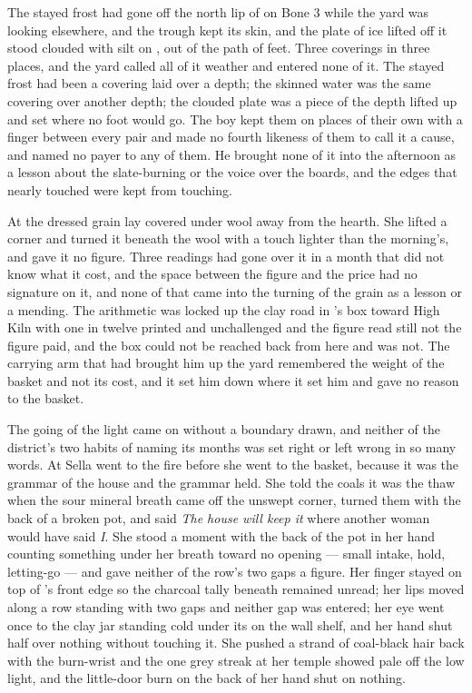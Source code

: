 The stayed frost had gone off the north lip of  on Bone 3 while the yard was looking elsewhere, and the trough kept its skin, and the plate of ice lifted off it stood clouded with silt on , out of the path of feet. Three coverings in three places, and the yard called all of it weather and entered none of it. The stayed frost had been a covering laid over a depth; the skinned water was the same covering over another depth; the clouded plate was a piece of the depth lifted up and set where no foot would go. The boy kept them on places of their own with a finger between every pair and made no fourth likeness of them to call it a cause, and named no payer to any of them. He brought none of it into the afternoon as a lesson about the slate-burning or the voice over the boards, and the edges that nearly touched were kept from touching.

At  the dressed grain lay covered under wool away from the hearth. She lifted a corner and turned it beneath the wool with a touch lighter than the morning's, and gave it no figure. Three readings had gone over it in a month that did not know what it cost, and the space between the figure and the price had no signature on it, and none of that came into the turning of the grain as a lesson or a mending. The arithmetic was locked up the clay road in 's box toward High Kiln with one in twelve printed and unchallenged and the figure read still not the figure paid, and the box could not be reached back from here and was not. The carrying arm that had brought him up the yard remembered the weight of the basket and not its cost, and it set him down where it set him and gave no reason to the basket.

The going of the light came on without a boundary drawn, and neither of the district's two habits of naming its months was set right or left wrong in so many words. At  Sella went to the fire before she went to the basket, because it was the grammar of the house and the grammar held. She told the coals it was the thaw when the sour mineral breath came off the unswept corner, turned them with the back of a broken pot, and said \emph{The house will keep it} where another woman would have said \emph{I}. She stood a moment with the back of the pot in her hand counting something under her breath toward no opening --- small intake, hold, letting-go --- and gave neither of the row's two gaps a figure. Her finger stayed on top of 's front edge so the charcoal tally beneath remained unread; her lips moved along a row standing with two gaps and neither gap was entered; her eye went once to the clay jar standing cold under its  on the wall shelf, and her hand shut half over nothing without touching it. She pushed a strand of coal-black hair back with the burn-wrist and the one grey streak at her temple showed pale off the low light, and the little-door burn on the back of her hand shut on nothing.

